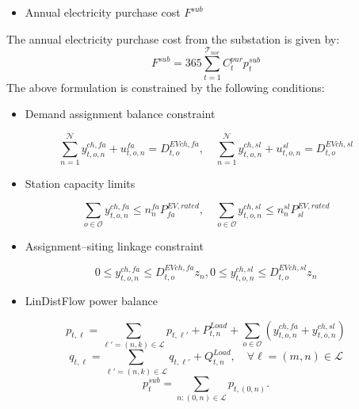 \documentclass[journal]{IEEEtran}
\providecommand{\1}{\mathbf{1}}
\begin{document}
 
 
\begin{itemize}
    \item Annual electricity purchase cost $F^{sub}$
\end{itemize}
\hspace*{0.7em}The annual electricity purchase cost from the substation is given by:
\begin{equation}
F^{{sub}}
=
365 \sum_{t=1}^{\mathcal{T}_{nor}}C_{t}^{{pur}}
p_{t}^{sub}
\end{equation}
\hspace*{0.7em}The above formulation is constrained by the following conditions:
\begin{itemize}
    \item Demand assignment balance constraint
\end{itemize}
\begin{equation}
\sum_{n=1}^{\mathcal{N}} y_{t,o,n}^{ch,fa}+u_{t,o,n}^{fa}
=
D_{t,o}^{EVch,fa},  \quad\sum_{n=1}^{\mathcal{N}} y_{t,o,n}^{ch,sl}+u_{t,o,n}^{sl}
=
D_{t,o}^{EVch,sl}
\label{eq:1}
\end{equation}
\begin{itemize}
    \item Station capacity limits
\end{itemize}
\begin{equation}
\sum_{o \in \mathcal O}
y_{t,o,n}^{ch,fa}\le n_n^{fa}P^{EV,rated}_{fa},
\quad
\sum_{o \in \mathcal O}
y_{t,o,n}^{ch,sl}\le n_n^{sl}P^{EV,rated}_{sl}
\end{equation}

\begin{itemize}
    \item Assignment--siting linkage constraint
\end{itemize}
\begin{equation}
0\le y_{t,o,n}^{ch,fa}
\le
D_{t,o}^{EVch,fa}z_n,   
0\le y_{t,o,n}^{ch,sl}
\le
D_{t,o}^{EVch,sl}z_n
\end{equation}

\begin{itemize}
    \item LinDistFlow power balance
\end{itemize}
\begin{equation}
p_{t,\ell}=\sum_{\ell'=(n,k)\in \mathcal{L}} p_{t,\ell'} + P^{Load}_{t,n}+\sum_{o \in \mathcal O}
(y_{t,o,n}^{ch,fa}+y_{t,o,n}^{ch,sl})
\end{equation}
\begin{equation}
q_{t,\ell}=\sum_{\ell'=(n,k)\in \mathcal{L}} q_{t,\ell'} + Q^{Load}_{t,n},
\quad \forall \ell=(m,n)\in \mathcal{L}
\end{equation}
\begin{equation}
p_t^{{sub}}=\sum_{n:(0,n)\in\mathcal{L}} p_{t,(0,n)}.
\end{equation}
\end{document}
